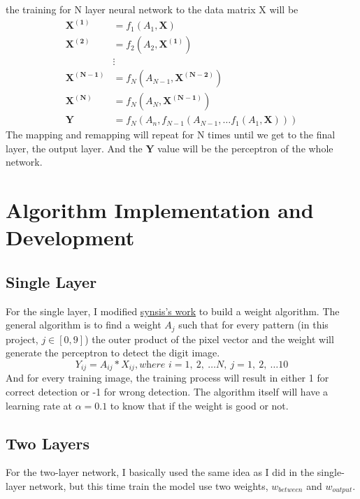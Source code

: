 \documentclass[preprint,12pt]{elsarticle}
\begin{document}
        the training for N layer neural network to the data matrix X will be
        \begin{align*}
            \mathbf{X^{(1)}}    &= f_1(A_1, \mathbf{X}) \\
            \mathbf{X^{(2)}}    &= f_2(A_2, \mathbf{X^{(1)}}) \\
                                &\vdots \\
            \mathbf{X^{(N - 1)}}    &= f_N(A_{N-1}, \mathbf{X^{(N-2)}}) \\
            \mathbf{X^{(N)}}    &= f_N(A_N, \mathbf{X^{(N-1)}}) \\
            \mathbf{Y}          &= f_N(A_n, f_{N-1}(A_{N-1}, \dots f_1(A_1, \mathbf{X})))
        \end{align*}
        The mapping and remapping will repeat for N times until we get to the final layer, the output layer. And the $\mathbf{Y}$
        value will be the perceptron of the whole network.

        \section{Algorithm Implementation and Development}
        \subsection{Single Layer}
        For the single layer, I modified \href{https://github.com/synsis/SINGLE-LAYER-PERCEPTRON-for-MNIST}{synsis's work} to build
        a weight algorithm. The general algorithm is to find a weight $A_j$ such that for every pattern (in this project, $j\in [0, 9]$)
        the outer product of the pixel vector and the weight will generate the perceptron to detect the digit image.
        \begin{equation*}
            Y_{ij} = A_{ij} * X_{ij}, \textit{where } i = 1,\ 2,\ \dots N,\ j = 1,\ 2,\ \dots 10
        \end{equation*} 
        And for every training image, the training process will result in either 1 for correct detection or -1 for wrong detection. 
        The algorithm itself will have a learning rate at $\alpha = 0.1$ to know that if the weight is good or not. 
        
        \subsection{Two Layers}
        For the two-layer network, I basically used the same idea as I did in the single-layer network, but this time train the model
        use two weights, $w_{between}$ and $w_{output}$. 
    
\end{document}
